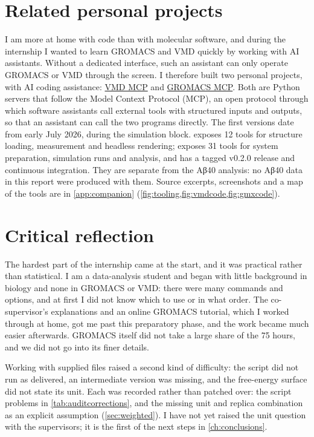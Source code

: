 \section{Related personal projects}
\label{sec:personal}
I am more at home with code than with molecular software, and during the internship I wanted to learn GROMACS and VMD quickly by working with AI assistants. Without a dedicated interface, such an assistant can only operate GROMACS or VMD through the screen. I therefore built two personal projects, with AI coding assistance: \href{https://github.com/Alierkn/vmd-mcp}{VMD MCP} and \href{https://github.com/Alierkn/gromacs-mcp}{GROMACS MCP}. Both are Python servers that follow the Model Context Protocol (MCP), an open protocol through which software assistants call external tools with structured inputs and outputs, so that an assistant can call the two programs directly. The first versions date from early July 2026, during the simulation block.  exposes 12 tools for structure loading, measurement and headless rendering;  exposes 31 tools for system preparation, simulation runs and analysis, and has a tagged v0.2.0 release and continuous integration. They are separate from the Aβ40 analysis: no Aβ40 data in this report were produced with them. Source excerpts, screenshots and a map of the tools are in \cref{app:companion} (\cref{fig:tooling,fig:vmdcode,fig:gmxcode}).

\section{Critical reflection}
The hardest part of the internship came at the start, and it was practical rather than statistical. I am a data-analysis student and began with little background in biology and none in GROMACS or VMD: there were many commands and options, and at first I did not know which to use or in what order. The co-supervisor's explanations and an online GROMACS tutorial, which I worked through at home, got me past this preparatory phase, and the work became much easier afterwards. GROMACS itself did not take a large share of the 75 hours, and we did not go into its finer details.

Working with supplied files raised a second kind of difficulty: the script did not run as delivered, an intermediate version was missing, and the free-energy surface did not state its unit. Each was recorded rather than patched over: the script problems in \cref{tab:auditcorrections}, and the missing unit and replica combination as an explicit assumption (\cref{sec:weighted}). I have not yet raised the unit question with the supervisors; it is the first of the next steps in \cref{ch:conclusions}.

